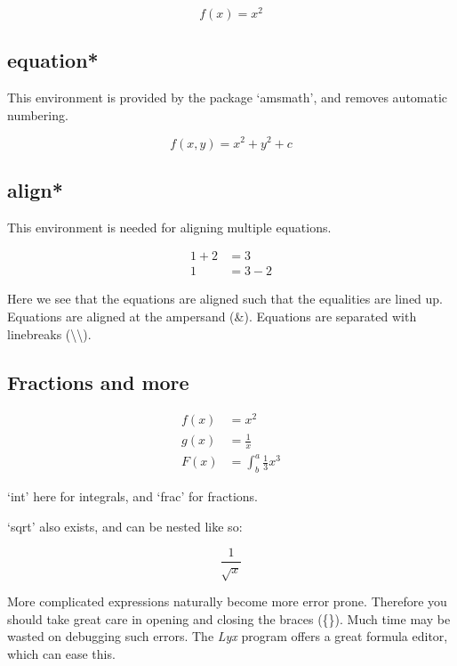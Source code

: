 \documentclass{article}
\begin{document}
\begin{equation}
	f(x) = x^2
\end{equation}

\subsection{equation*}

This environment is provided by the package `amsmath', and removes automatic numbering.

\begin{equation*}
	f(x, y) = x^2 + y^2 + c
\end{equation*}

\subsection{align*}

This environment is needed for aligning multiple equations.

\begin{align*}
	1 + 2 &= 3\\
	1 &= 3 - 2
\end{align*}

Here we see that the equations are aligned such that the equalities are lined up.
Equations are aligned at the ampersand (\&). Equations are separated with linebreaks (\textbackslash\textbackslash).

\subsection{Fractions and more}

\begin{align*}
	f(x) &= x^2\\
	g(x) &= \frac{1}{x}\\
	F(x) &= \int^a_b \frac{1}{3}x^3
\end{align*}

`int' here for integrals, and `frac' for fractions.

`sqrt' also exists, and can be nested like so:

\begin{equation*}
	\frac{1}{\sqrt{x}}
\end{equation*}

More complicated expressions naturally become more error prone. Therefore you should take great care in opening and closing the braces (\{\}). Much time may be wasted on debugging such errors. The \textit{Lyx} program offers a great formula editor, which can ease this.
\end{document}
